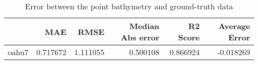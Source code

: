 \begin{table}[h!]
\centering
\caption{Error between the point bathymetry and ground-truth data}
\label{tab:oahu7_lidar_error}
\begin{tabular}{lrrrrr}
\toprule
 & MAE & RMSE & Median Abs error & R2 Score & Average Error \\
\midrule
oahu7 & 0.717672 & 1.111055 & 0.500108 & 0.866924 & -0.018269 \\
\bottomrule
\end{tabular}
\end{table}
